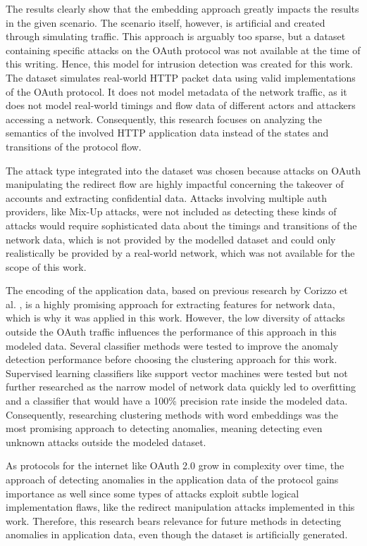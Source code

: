 \documentclass[
    fontsize=12pt,
    headings=small,
    parskip=half,           %
    bibliography=totoc,
    numbers=noenddot,       %
    open=any,               %
    ]{scrreprt}
\begin{document}
The results clearly show that the embedding approach greatly impacts the results in the given scenario. The scenario itself, however, is artificial and created through simulating traffic. This approach is arguably too sparse, but a dataset containing specific attacks on the OAuth protocol was not available at the time of this writing. Hence, this model for intrusion detection was created for this work. The dataset simulates real-world HTTP packet data using valid implementations of the OAuth protocol. It does not model metadata of the network traffic, as it does not model real-world timings and flow data of different actors and attackers accessing a network. Consequently, this research focuses on analyzing the semantics of the involved HTTP application data instead of the states and transitions of the protocol flow. 

The attack type integrated into the dataset was chosen because attacks on OAuth manipulating the redirect flow are highly impactful concerning the takeover of accounts and extracting confidential data. Attacks involving multiple auth providers, like Mix-Up attacks, were not included as detecting these kinds of attacks would require sophisticated data about the timings and transitions of the network data, which is not provided by the modelled dataset and could only realistically be provided by a real-world network, which was not available for the scope of this work.

The encoding of the application data, based on previous research by Corizzo et al. \cite{corizzo2020feature}, is a highly promising approach for extracting features for network data, which is why it was applied in this work. However, the low diversity of attacks outside the OAuth traffic influences the performance of this approach in this modeled data. Several classifier methods were tested to improve the anomaly detection performance before choosing the clustering approach for this work. Supervised learning classifiers like support vector machines were tested but not further researched as the narrow model of network data quickly led to overfitting and a classifier that would have a 100\% precision rate inside the modeled data. Consequently, researching clustering methods with word embeddings was the most promising approach to detecting anomalies, meaning detecting even unknown attacks outside the modeled dataset.

As protocols for the internet like OAuth 2.0 grow in complexity over time, the approach of detecting anomalies in the application data of the protocol gains importance as well since some types of attacks exploit subtle logical implementation flaws, like the redirect manipulation attacks implemented in this work. Therefore, this research bears relevance for future methods in detecting anomalies in application data, even though the dataset is artificially generated.
\end{document}
